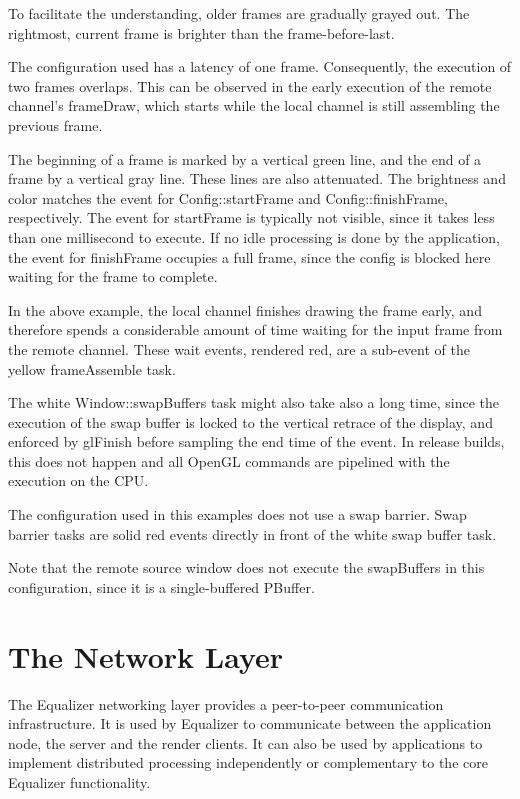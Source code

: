 \documentclass[10pt,a4]{scrartcl}
\begin{document}
To facilitate the understanding, older frames are gradually grayed
out. The rightmost, current frame is brighter than the
frame-before-last.

The configuration used has a latency of one frame. Consequently, the
execution of two frames overlaps. This can be observed in the early
execution of the remote channel's \textsf{frameDraw}, which starts while
the local channel is still assembling the previous frame.

The beginning of a frame is marked by a vertical green line, and the end
of a frame by a vertical gray line. These lines are also attenuated. The
brightness and color matches the event for \textsf{Config::startFrame}
and \textsf{Config::finishFrame}, respectively. The event for
\textsf{startFrame} is typically not visible, since it takes less than
one millisecond to execute. If no idle processing is done by the
application, the event for \textsf{finishFrame} occupies a full frame,
since the config is blocked here waiting for the frame to complete.

In the above example, the local channel finishes drawing the frame
early, and therefore spends a considerable amount of time waiting for
the input frame from the remote channel. These wait events, rendered
red, are a sub-event of the yellow \textsf{frameAssemble} task.

The white \textsf{Window::swapBuffers} task might also take also a long
time, since the execution of the swap buffer is locked to the vertical
retrace of the display, and enforced by \textsf{glFinish} before
sampling the end time of the event. In release builds, this does not
happen and all OpenGL commands are pipelined with the execution on the
CPU.

The configuration used in this examples does not use a swap
barrier. Swap barrier tasks are solid red events directly in front of
the white swap buffer task.

Note that the remote source window does not execute the swapBuffers in
this configuration, since it is a single-buffered PBuffer.



\section{\label{sNetwork}The Network Layer}

The Equalizer networking layer provides a peer-to-peer communication
infrastructure. It is used by Equalizer to communicate between the
application node, the server and the render clients. It can also be
used by applications to implement distributed processing independently
or complementary to the core Equalizer functionality.
\end{document}
